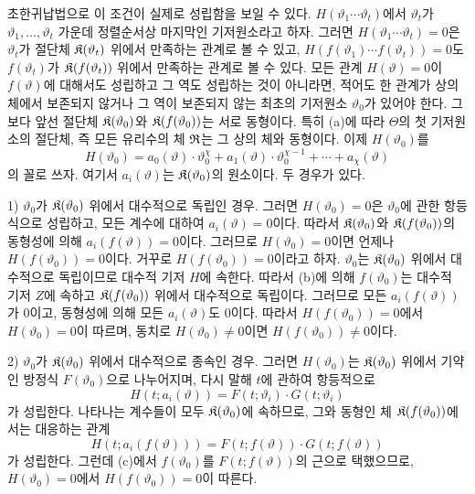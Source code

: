 초한귀납법으로 이 조건이 실제로 성립함을 보일 수 있다. \(H(\vartheta_1\cdots\vartheta_t)\)에서 \(\vartheta_t\)가 \(\vartheta_1,\ldots,\vartheta_t\) 가운데 정렬순서상 마지막인 기저원소라고 하자. 그러면 \(H(\vartheta_1\cdots\vartheta_t)=0\)은 \(\vartheta_t\)가 절단체 \(\mathfrak K(\vartheta_t)\) 위에서 만족하는 관계로 볼 수 있고, \(H(f(\vartheta_1)\cdots f(\vartheta_t))=0\)도 \(f(\vartheta_t)\)가 \(\mathfrak K(f(\vartheta_t))\) 위에서 만족하는 관계로 볼 수 있다. 모든 관계 \(H(\vartheta)=0\)이 \(f(\vartheta)\)에 대해서도 성립하고 그 역도 성립하는 것이 아니라면, 적어도 한 관계가 상의 체에서 보존되지 않거나 그 역이 보존되지 않는 최초의 기저원소 \(\vartheta_0\)가 있어야 한다. 그보다 앞선 절단체 \(\mathfrak K(\vartheta_0)\)와 \(\mathfrak K(f(\vartheta_0))\)는 서로 동형이다. 특히 (a)에 따라 \(\Theta\)의 첫 기저원소의 절단체, 즉 모든 유리수의 체 \(\mathfrak R\)는 그 상의 체와 동형이다. 이제 \(H(\vartheta_0)\)를
\[
H(\vartheta_0)=a_0(\vartheta)\cdot\vartheta_0^\chi
+a_1(\vartheta)\cdot\vartheta_0^{\chi-1}+\cdots+a_\chi(\vartheta)
\]
의 꼴로 쓰자. 여기서 \(a_i(\vartheta)\)는 \(\mathfrak K(\vartheta_0)\)의 원소이다. 두 경우가 있다.

1) \(\vartheta_0\)가 \(\mathfrak K(\vartheta_0)\) 위에서 대수적으로 독립인 경우. 그러면 \(H(\vartheta_0)=0\)은 \(\vartheta_0\)에 관한 항등식으로 성립하고, 모든 계수에 대하여 \(a_i(\vartheta)=0\)이다. 따라서 \(\mathfrak K(\vartheta_0)\)와 \(\mathfrak K(f(\vartheta_0))\)의 동형성에 의해 \(a_i(f(\vartheta))=0\)이다. 그러므로 \(H(\vartheta_0)=0\)이면 언제나 \(H(f(\vartheta_0))=0\)이다. 거꾸로 \(H(f(\vartheta_0))=0\)이라고 하자. \(\vartheta_0\)는 \(\mathfrak K(\vartheta_0)\) 위에서 대수적으로 독립이므로 대수적 기저 \(H\)에 속한다. 따라서 (b)에 의해 \(f(\vartheta_0)\)는 대수적 기저 \(Z\)에 속하고 \(\mathfrak K(f(\vartheta_0))\) 위에서 대수적으로 독립이다. 그러므로 모든 \(a_i(f(\vartheta))\)가 0이고, 동형성에 의해 모든 \(a_i(\vartheta)\)도 0이다. 따라서 \(H(f(\vartheta_0))=0\)에서 \(H(\vartheta_0)=0\)이 따르며, 동치로 \(H(\vartheta_0)\ne0\)이면 \(H(f(\vartheta_0))\ne0\)이다.

2) \(\vartheta_0\)가 \(\mathfrak K(\vartheta_0)\) 위에서 대수적으로 종속인 경우. 그러면 \(H(\vartheta_0)\)는 \(\mathfrak K(\vartheta_0)\) 위에서 기약인 방정식 \(F(\vartheta_0)\)으로 나누어지며, 다시 말해 \(t\)에 관하여 항등적으로
\[
H(t;a_i(\vartheta))=F(t;\vartheta_i)\cdot G(t;\vartheta_i)
\]
가 성립한다. 나타나는 계수들이 모두 \(\mathfrak K(\vartheta_0)\)에 속하므로, 그와 동형인 체 \(\mathfrak K(f(\vartheta_0))\)에서는 대응하는 관계
\[
H(t;a_i(f(\vartheta)))=F(t;f(\vartheta))\cdot G(t;f(\vartheta))
\]
가 성립한다. 그런데 (c)에서 \(f(\vartheta_0)\)를 \(F(t;f(\vartheta))\)의 근으로 택했으므로, \(H(\vartheta_0)=0\)에서 \(H(f(\vartheta_0))=0\)이 따른다.

